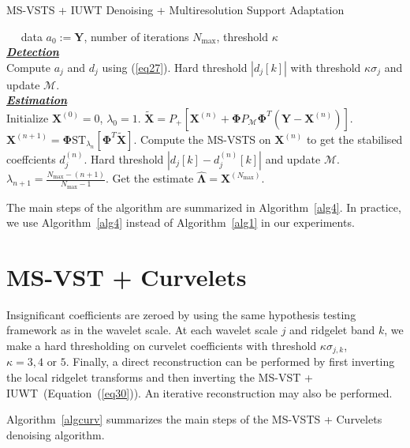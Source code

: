\begin{algorithm}
\caption{MS-VSTS + IUWT Denoising + Multiresolution Support Adaptation}
\label{alg4}
\begin{algorithmic}[1]
\REQUIRE $\quad$ data $a_0:=\mathbf{Y}$, number of iterations $N_{\max}$, threshold $\kappa$ \\
\underline{\emph{\textbf{Detection}}} \\
\STATE Compute $a_j$ and $d_j$ using (\ref{eq27}).
\STATE Hard threshold $|d_j[k]|$ with threshold $\kappa \sigma_j$ and update $\mathcal{M}$.
\ENDFOR \\
\underline{\emph{\textbf{Estimation}}} \\
\STATE Initialize $\mathbf{X}^{(0)}=0$, $\lambda_0 = 1$.
\STATE $\tilde{\mathbf{X}}= P_{+}[\mathbf{ X}^{(n)} + \mathbf{ \Phi} P_{\mathcal{M}} \mathbf{ \Phi}^{T} (\mathbf{ Y} - \mathbf{ X}^{(n)})]$.
\STATE $\mathbf{X}^{(n+1)} = \mathbf{ \Phi}\text{ST}_{\lambda_n}[\mathbf{ \Phi}^{T}\tilde{\mathbf{X}}]$.
\STATE Compute the MS-VSTS on  $\mathbf{X}^{(n)}$ to get the stabilised coeffcients $d^{(n)}_j$.
\STATE Hard threshold $|d_j[k]-d^{(n)}_j[k]|$ and update $\mathcal{M}$.
\STATE $\lambda_{n+1} = \frac{N_{\max} - (n+1)}{N_{\max} - 1}$.
\ENDFOR
\STATE Get the estimate $\hat{\mathbf{\Lambda}} = \mathbf{X}^{(N_{\max})}$.

\end{algorithmic}
\end{algorithm}

The main steps of the algorithm are summarized in Algorithm~\ref{alg4}. In practice, we use Algorithm~\ref{alg4} instead of Algorithm~\ref{alg1} in our experiments.

\section{MS-VST + Curvelets}

Insignificant coefficients are zeroed by using the same hypothesis testing framework as in the wavelet scale. At each wavelet scale $j$ and ridgelet band $k$, we make a hard thresholding on curvelet coefficients with threshold $\kappa \sigma_{j,k}$, $\kappa= 3,4 \text{ or } 5$. Finally, a direct reconstruction can be performed by first inverting the local ridgelet transforms and then inverting the MS-VST + IUWT~(Equation~(\ref{eq30})). An iterative reconstruction may also be performed.

Algorithm~\ref{algcurv} summarizes the  main steps of the MS-VSTS + Curvelets denoising algorithm.

